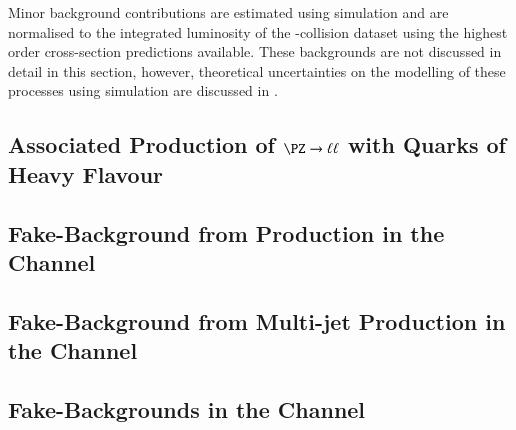 Minor background contributions are estimated using simulation and are normalised
to the integrated luminosity of the \pp-collision dataset using the highest
order cross-section predictions available. These backgrounds are not discussed
in detail in this section, however, theoretical uncertainties on the modelling
of these processes using simulation are discussed in
.

\subsection{Associated Production of $\PZ \to \ell\ell$ with Quarks of Heavy Flavour}%
\label{sec:bkg_zjets}


\subsection{Fake-\tauhadvis Background from \ttbar Production in the \hadhad Channel}%
\label{sec:bkg_hadhad_ttbarfakes}


\subsection{Fake-\tauhadvis Background from Multi-jet Production in the \hadhad Channel}%
\label{sec:bkg_hadhad_ff}%
\label{sec:hadhad_multijet}


\subsection{Fake-\tauhadvis Backgrounds in the \lephad Channel}%
\label{sec:bkg_lephad_combined_ff}



